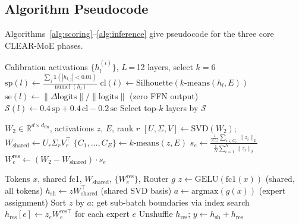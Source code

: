 \FloatBarrier
\subsection{Algorithm Pseudocode}
\label{app:algorithms}

Algorithms~\ref{alg:scoring}--\ref{alg:inference} give pseudocode for the three core CLEAR-MoE phases.

\begin{algorithm}[H]
\caption{Phase 2: Layer Scoring and Selection}
\label{alg:scoring}
\begin{algorithmic}[1]
\REQUIRE Calibration activations $\{h_l^{(i)}\}$, $L$\,=\,12 layers, select $k{=}6$
  \STATE $\text{sp}(l) \gets \frac{\sum_j \mathbf{1}(|h_{l,j}|<0.01)}{\operatorname{numel}(h_l)}$
  \STATE $\text{cl}(l) \gets \text{Silhouette}(k\text{-means}(h_l, E))$
  \STATE $\text{se}(l) \gets \|\Delta\text{logits}\|/\|\text{logits}\|$ \hfill (zero FFN output)
  \STATE $\mathcal{S}(l) \gets 0.4\,\text{sp} + 0.4\,\text{cl} - 0.2\,\text{se}$
\ENDFOR
\STATE Select top-$k$ layers by $\mathcal{S}$
\end{algorithmic}
\end{algorithm}

\begin{algorithm}[H]
\caption{Phase 3: Expert Extraction (fc1 shared; fc2 decomposed)}
\label{alg:extraction}
\begin{algorithmic}[1]
\REQUIRE $W_2 \in \mathbb{R}^{d \times d_\text{ffn}}$, activations $z$, $E$, rank $r$
\STATE $[U,\Sigma,V] \gets \text{SVD}(W_2)$; \; $W_\text{shared} \gets U_r\Sigma_r V_r^\top$
\STATE $\{C_1,\ldots,C_E\} \gets k\text{-means}(z, E)$
  \STATE $s_e \gets \frac{\frac{1}{|C_e|}\sum_{i\in C_e}\|z_i\|_2}{\frac{1}{N}\sum_{i=1}^{N}\|z_i\|_2}$
  \STATE $W_e^\text{res} \gets (W_2 - W_\text{shared}) \cdot s_e$
\ENDFOR
\end{algorithmic}
\end{algorithm}

\begin{algorithm}[H]
\caption{CLEAR-MoE FFN Inference (Grouped backend)}
\label{alg:inference}
\begin{algorithmic}[1]
\REQUIRE Tokens $x$, shared fc1, $W_\text{shared}$, $\{W_e^\text{res}\}$, Router $g$
\STATE $z \gets \text{GELU}(\text{fc1}(x))$ \hfill (shared, all tokens)
\STATE $h_\text{sh} \gets z W_\text{shared}^\top$ \hfill (shared SVD basis)
\STATE $a \gets \text{argmax}(g(x))$ \hfill (expert assignment)
\STATE Sort $z$ by $a$; get sub-batch boundaries via index search
\STATE $h_\text{res}[e] \gets z_e W_e^{\text{res}\top}$ for each expert $e$
\STATE Unshuffle $h_\text{res}$; $y \gets h_\text{sh} + h_\text{res}$
\end{algorithmic}
\end{algorithm}


